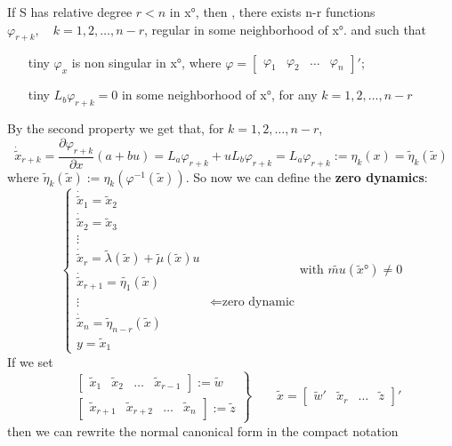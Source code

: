 \begin{lemma}
	If S has relative degree $r<n$ in x°, then , there exists n-r functions $\varphi_{r+k},\quad k=1,2,\dots,n-r$, regular in some neighborhood of x°. and such that \begin{itemize}
		\item[tiny] $\varphi_x$ is non singular in x°, where $\varphi=\begin{bmatrix} \varphi_1 & \varphi_2 & 	\dots & \varphi_n
		\end{bmatrix}'$;
	\item[tiny] $L_b\varphi_{r+k}=0$ in some neighborhood of x°, for any $k=1,2,\dots,n-r$
	\end{itemize} 
\end{lemma}
By the second property we get that, for $k=1,2,\dots,n-r$,\[\dot{\tilde{x}}_{r+k}=\frac{\partial\varphi_{r+k}}{\partial x}(a+bu)=L_a\varphi_{r+k}+uL_b\varphi_{r+k}=L_a\varphi_{r+k}:=\eta_k(x)=\tilde{\eta}_k(\tilde{x})\] where $\tilde{\eta}_k(\tilde{x}):=\eta_k(\varphi^{-1}(\tilde{x}))$.
So now we can define the \textbf{zero dynamics}:
\[
\begin{cases}
	\dot{\tilde{x}}_1=\tilde{x}_2\\
	\dot{\tilde{x}}_2=\tilde{x}_3\\
	\vdots\\
	\dot{\tilde{x}}_r=\tilde{\lambda}(\tilde{x})+\tilde{\mu}(\tilde{x})u\\
	\dot{\tilde{x}}_{r+1}=\tilde{\eta_1}(\tilde{x})\\
	\vdots & \Leftarrow\text{zero dynamic}\\
	\dot{\tilde{x}}_n=\tilde{\eta}_{n-r}(\tilde{x})\\
	y=\tilde{x}_1
\end{cases}
\text{with } \tilde{mu}(\tilde{x}°)\neq0
\] 
If we set
\[
\left.
\begin{aligned}
	& \begin{bmatrix} \tilde{x}_1 & \tilde{x}_2 & \dots & \tilde{x}_{r-1}\end{bmatrix} := \tilde{w}\\
	&  \begin{bmatrix} \tilde{x}_{r+1} & \tilde{x}_{r+2} & \dots & \tilde{x}_n\end{bmatrix}:=\tilde{z}
\end{aligned}
\right\rbrace\qquad 	\tilde{x}=  \begin{bmatrix} \tilde{w}' & \tilde{x}_r & \dots & \tilde{z}\end{bmatrix}'
\] then we can  rewrite the normal canonical form in the compact notation
